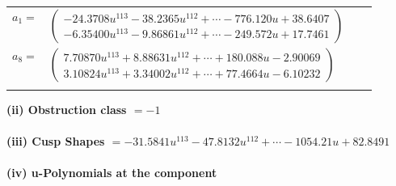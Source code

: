 \documentclass[1p]{elsarticle_modified}
\theoremstyle{definition}
\begin{document}
\begin{tabular}{m{7pt} m{180pt} m{7pt} m{180pt} }
\flushright $a_{1}=$&$\begin{pmatrix}-24.3708 u^{113}-38.2365 u^{112}+\cdots-776.120 u+38.6407\\-6.35400 u^{113}-9.86861 u^{112}+\cdots-249.572 u+17.7461\end{pmatrix}$ \\
\flushright $a_{8}=$&$\begin{pmatrix}7.70870 u^{113}+8.88631 u^{112}+\cdots+180.088 u-2.90069\\3.10824 u^{113}+3.34002 u^{112}+\cdots+77.4664 u-6.10232\end{pmatrix}$\\&\end{tabular}
\flushleft \textbf{(ii) Obstruction class $= -1$}\\~\\
\flushleft \textbf{(iii) Cusp Shapes $= -31.5841 u^{113}-47.8132 u^{112}+\cdots-1054.21 u+82.8491$}\\~\\
\newpage\renewcommand{\arraystretch}{1}
\flushleft \textbf{(iv) u-Polynomials at the component}\newline \\
\end{document}

